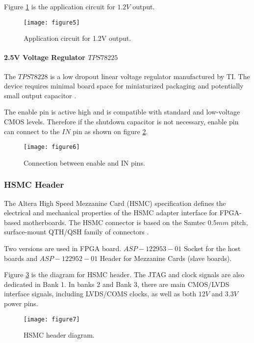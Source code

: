 Figure \ref{fig:b2_f5} is the application circuit for $1.2V$ output.

\begin{figure}
 \centering
 \texttt{[image: figure5]}
 \caption{Application circuit for 1.2V output.}
 \label{fig:b2_f5}
\end{figure}



\paragraph{2.5V Voltage Regulator \texorpdfstring{$TPS78225$}{TPS78225}}
The $TPS78228$ is a low dropout linear voltage regulator manufactured by TI.
The device requires minimal board space for miniaturized packaging and potentially small output capacitor \citep{TI:2008:TPS782}.

The enable pin is active high and is compatible with standard and low-voltage CMOS levels. Therefore if the shutdown capacitor is not necessary, enable pin can connect to the $IN$ pin as shown on figure \ref{fig:b2_f6}.

\begin{figure}
 \centering
 \texttt{[image: figure6]}
 \caption{Connection between enable and IN pins.}
 \label{fig:b2_f6}
\end{figure}


\subsubsection{HSMC Header}
The Altera High Speed Mezzanine Card (HSMC) specification defines the electrical
and mechanical properties of the HSMC adapter interface for FPGA-based motherboards.
The HSMC connector is based on the Samtec $0.5mm$ pitch, surface-mount QTH/QSH family of connectors \citep{Altera:2009:HSMCspec}.

Two versions are used in FPGA board. $ASP-122953-01$ Socket for the host boards and $ASP-122952-01$ Header for Mezzanine Cards (slave boards).

Figure \ref{fig:b2_f7} is the diagram for HSMC header. 
The JTAG and clock signals are also dedicated in Bank 1. In banks 2 and Bank 3, there are main CMOS/LVDS interface signals, including LVDS/COMS clocks, as well as both $12V$ and $3.3V$ power pins.

\begin{figure}
 \centering
 \texttt{[image: figure7]}
 \caption{HSMC header diagram.}
 \label{fig:b2_f7}
\end{figure}

